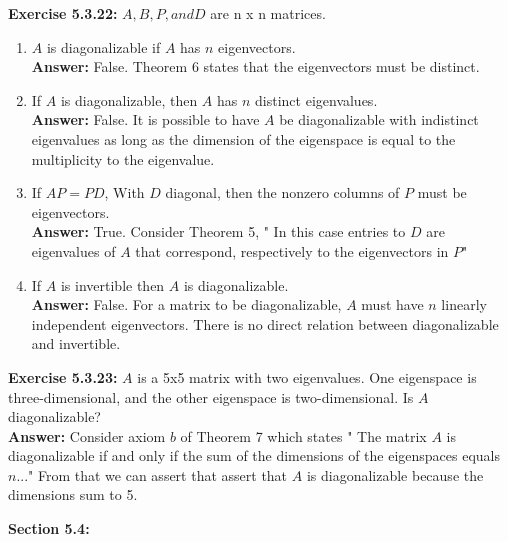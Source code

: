 \documentclass{amsart}
\begin{document}
\noindent\textbf{Exercise 5.3.22: } $A, B, P, and D$ are n x n matrices. 
\begin{enumerate}

\item $A$ is diagonalizable if $A$ has $n$ eigenvectors.\\
\noindent \textbf{Answer: }False. Theorem 6 states that the eigenvectors must be distinct. 
\vspace{1in}


\item If $A$ is diagonalizable, then $A$ has $n$ distinct eigenvalues.\\
\noindent \textbf{Answer: }False. It is possible to have $A$ be diagonalizable with indistinct eigenvalues as long as the dimension of the eigenspace is equal to the multiplicity to the eigenvalue.
\vspace{1in}

\item If $AP = PD$, With $D$ diagonal, then the nonzero columns of $P$ must be eigenvectors.\\
\noindent \textbf{Answer: }True. Consider Theorem 5, " In this case entries to $D$ are eigenvalues of $A$ that correspond, respectively to the eigenvectors in $P$"
\vspace{1in}

\item If $A$ is invertible then $A$ is diagonalizable.\\
\noindent \textbf{Answer: }False. For a matrix to be diagonalizable, $A$ must have $n$ linearly independent eigenvectors. There is no direct relation between diagonalizable and invertible.
\vspace{1in}

\end{enumerate}


\noindent\textbf{Exercise 5.3.23: } $A$ is a 5x5 matrix with two eigenvalues. One eigenspace is three-dimensional, and the other eigenspace is two-dimensional. Is $A$ diagonalizable?\\
\noindent \textbf{Answer: } Consider axiom $b$ of Theorem 7 which states " The matrix $A$ is diagonalizable if and only if the sum of the dimensions of the eigenspaces equals $n$..." From that we can assert that assert that $A$ is diagonalizable because the dimensions sum to 5.
\vspace{1in}




{\huge\textbf{Section 5.4:}}\\\\
\end{document}
